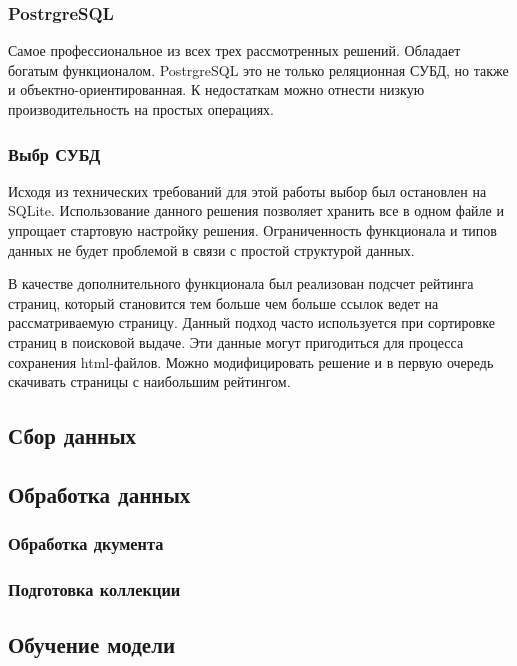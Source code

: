 \subsubsection{PostrgreSQL}

Самое профессиональное из всех трех рассмотренных решений. Обладает богатым функционалом. PostrgreSQL это не только реляционная СУБД, но также и объектно-ориентированная. К недостаткам можно отнести низкую производительность на простых операциях.

\subsubsection{Выбр СУБД}

Исходя из технических требований для этой работы выбор был остановлен на SQLite. Использование данного решения позволяет хранить все в одном файле и упрощает стартовую настройку решения. Ограниченность функционала и типов данных не будет проблемой в связи с простой структурой данных.

В качестве дополнительного функционала был реализован подсчет рейтинга страниц, который становится тем больше чем больше ссылок ведет на рассматриваемую страницу. Данный подход часто используется при сортировке страниц в поисковой выдаче. Эти данные могут пригодиться для процесса сохранения html-файлов. Можно модифицировать решение и в первую очередь скачивать страницы с наибольшим рейтингом.

\subsection{Сбор данных}



\subsection{Обработка данных}

\subsubsection{Обработка дкумента}

\subsubsection{Подготовка коллекции}

\subsection{Обучение модели}

